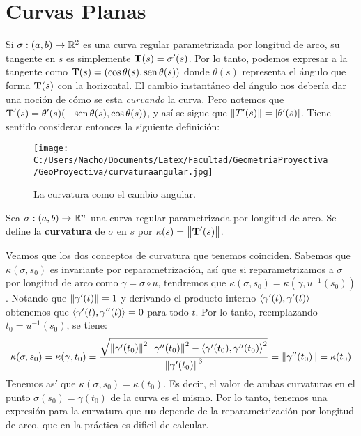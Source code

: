 \section{Curvas Planas}

Si $\sigma:(a,b)\to\mathbb{R}^2$ es una curva regular parametrizada por longitud de arco, su tangente en $s$ es simplemente $\operatorname{\mathbf{T}}(s)=\sigma'(s)$. Por lo tanto, podemos expresar a la tangente como $\operatorname{\mathbf{T}}(s)=(\cos\theta(s),\operatorname{sen}\theta(s))$ donde $\theta(s)$ representa el ángulo que forma $\operatorname{\mathbf{T}}(s)$ con la horizontal. El cambio instantáneo del ángulo nos debería dar una noción de cómo se esta \textit{curvando} la curva. Pero notemos que $\operatorname{\mathbf{T}}'(s)=\theta'(s)(-\operatorname{sen}\theta(s),\cos\theta(s))$, y así se sigue que $\left\| T'(s) \right\|=\left\lvert \theta'(s) \right\rvert$. Tiene sentido considerar entonces la siguiente definición:

\begin{figure}[h]
	\centering
		\texttt{[image: C:/Users/Nacho/Documents/Latex/Facultad/GeometriaProyectiva/GeoProyectiva/curvaturaangular.jpg]}
	\caption{La curvatura como el cambio angular.}
	\label{fig:curvaturaangular}
\end{figure}


\begin{defn}
Sea $\sigma:(a,b)\to\mathbb{R}^n$ una curva regular parametrizada por longitud de arco. Se define la \textbf{curvatura} de $\sigma$ en $s$ por $\kappa(s)=\left\| \operatorname{\mathbf{T}}'(s) \right\|$.
\end{defn}

\begin{obs}
Veamos que los dos conceptos de curvatura que tenemos coinciden. Sabemos que $\kappa(\sigma,s_0)$ es invariante por reparametrización, así que si reparametrizamos a $\sigma$ por longitud de arco como $\gamma=\sigma\circ u$, tendremos que $\kappa(\sigma,s_0) = \kappa(\gamma,u^{-1}(s_0))$. Notando que $\left\| \gamma'(t) \right\|=1$ y derivando el producto interno $\left\langle \gamma'(t),\gamma'(t) \right\rangle$ obtenemos que $\left\langle \gamma'(t),\gamma''(t) \right\rangle=0$ para todo $t$. Por lo tanto, reemplazando $t_0=u^{-1}(s_0)$, se tiene: $$\kappa(\sigma,s_0)=\kappa(\gamma,t_0)=\dfrac{\sqrt{\left\| \gamma'(t_0) \right\|^2\left\| \gamma''(t_0) \right\|^2 - \left\langle \gamma'(t_0),\gamma''(t_0) \right\rangle^2}}{\left\| \gamma'(t_0) \right\|^3} = \left\| \gamma''(t_0) \right\|=\kappa(t_0)$$ Tenemos así que $\kappa(\sigma,s_0)=\kappa(t_0)$. Es decir, el valor de ambas curvaturas en el punto $\sigma(s_0)=\gamma(t_0)$ de la curva es el mismo. Por lo tanto, tenemos una expresión para la curvatura que \textbf{no} depende de la reparametrización por longitud de arco, que en la práctica es dificil de calcular.
\end{obs}

